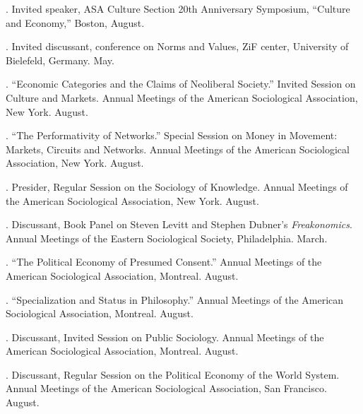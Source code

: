 \documentclass[11pt]{article}
\begin{document}
. Invited speaker, ASA Culture Section 20th Anniversary Symposium, ``Culture and Economy,'' Boston, August.

. Invited discussant, conference on Norms and Values, ZiF center, University of Bielefeld, Germany. May. 

. ``Economic Categories and the Claims of Neoliberal Society.'' Invited Session on Culture and Markets. Annual Meetings of the American Sociological Association, New York. August.

. ``The Performativity of Networks.'' Special Session on Money in Movement: Markets, Circuits and Networks. Annual Meetings of the American Sociological Association, New York. August.

. Presider, Regular Session on the Sociology of Knowledge. Annual Meetings of the American Sociological Association, New York. August.

. Discussant, Book Panel on Steven Levitt and Stephen Dubner's \emph{Freakonomics}. Annual Meetings of the Eastern Sociological Society, Philadelphia. March.

. ``The Political Economy of Presumed Consent.'' Annual Meetings of the American Sociological Association, Montreal. August.

. ``Specialization and Status in Philosophy.'' Annual Meetings of the American Sociological Association, Montreal. August.

. Discussant, Invited Session on Public Sociology. Annual Meetings of the American Sociological Association, Montreal. August.

. Discussant, Regular Session on the Political Economy of the World System. Annual Meetings of the American Sociological Association, San Francisco. August.


\end{document}
